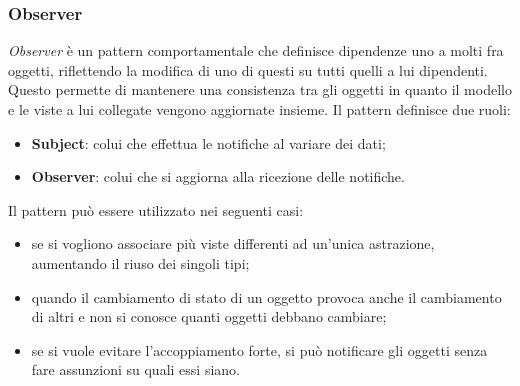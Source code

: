 \subsubsection{Observer}
\textit{Observer} è un pattern comportamentale che definisce dipendenze uno a molti fra oggetti, riflettendo la modifica di uno di questi su tutti quelli a lui dipendenti. Questo permette di mantenere una consistenza tra gli oggetti in quanto il modello e le viste a lui collegate vengono aggiornate insieme. 
Il pattern definisce due ruoli:
\begin{itemize}
	\item \textbf{Subject}: colui che effettua le notifiche al variare dei dati;
	\item \textbf{Observer}: colui che si aggiorna alla ricezione delle notifiche.
\end{itemize}
Il pattern può essere utilizzato nei seguenti casi:
\begin{itemize}
	\item se si vogliono associare più viste differenti ad un’unica astrazione, aumentando il riuso dei singoli tipi;
	\item quando il cambiamento di stato di un oggetto provoca anche il cambiamento di altri e non si conosce quanti oggetti debbano cambiare;
	\item se si vuole evitare l’accoppiamento forte, si può notificare gli oggetti senza fare assunzioni su quali essi siano.
\end{itemize}